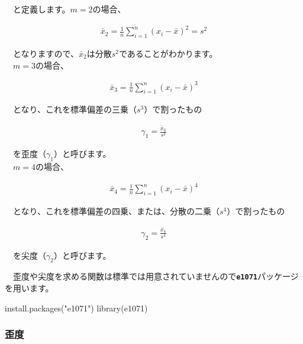 \documentclass[
  12pt,
]{book}
\newenvironment{Shaded}{\begin{snugshade}}{\end{snugshade}}
\newcommand{\FunctionTok}[1]{\textcolor[rgb]{0.00,0.00,0.00}{#1}}
\newcommand{\NormalTok}[1]{#1}
\newcommand{\StringTok}[1]{\textcolor[rgb]{0.31,0.60,0.02}{#1}}
\begin{document}
　と定義します。\(m = 2\)の場合、

\begin{align}
  \bar{x}_2 = \frac{1}{n}\sum_{i = 1}^{n}(x_i - \bar{x})^2 = s^2 \label{eq:moment2}
\end{align}

　となりますので、\(\bar{x}_2\)は分散\(s^2\)であることがわかります。\\
　\(m = 3\)の場合、

\begin{align}
  \bar{x}_3 = \frac{1}{n}\sum_{i = 1}^{n}(x_i - \bar{x})^3 \label{eq:moment3}
\end{align}

　となり、これを標準偏差の三乗（\(s^3\)）で割ったもの

\begin{align}
  \gamma_1 = \frac{\bar{x}_3}{s^3} \label{eq:skewness}
\end{align}

　を歪度（\(\gamma_1\)）と呼びます。\\
　\(m = 4\)の場合、

\begin{align}
  \bar{x}_4 = \frac{1}{n}\sum_{i = 1}^{n}(x_i - \bar{x})^4  \label{eq:moment4}
\end{align}

　となり、これを標準偏差の四乗、または、分散の二乗（\(s^4\)）で割ったもの

\begin{align}
  \gamma_2 = \frac{\bar{x}_4}{s^4} \label{eq:kurtosise}
\end{align}

　を尖度（\(\gamma_2\)）と呼びます。

　歪度や尖度を求める関数は標準では用意されていませんので\textbf{\texttt{e1071}}パッケージ\citep{R-e1071}を用います。

\begin{Shaded}
\begin{Highlighting}[numbers=left,,]
\FunctionTok{install.packages}\NormalTok{(}\StringTok{"e1071"}\NormalTok{)}
\FunctionTok{library}\NormalTok{(e1071)}
\end{Highlighting}
\end{Shaded}

\hypertarget{ux6b6aux5ea6}{%
\subsubsection*{\texorpdfstring{歪度}{歪度}}\label{ux6b6aux5ea6}}
\end{document}
